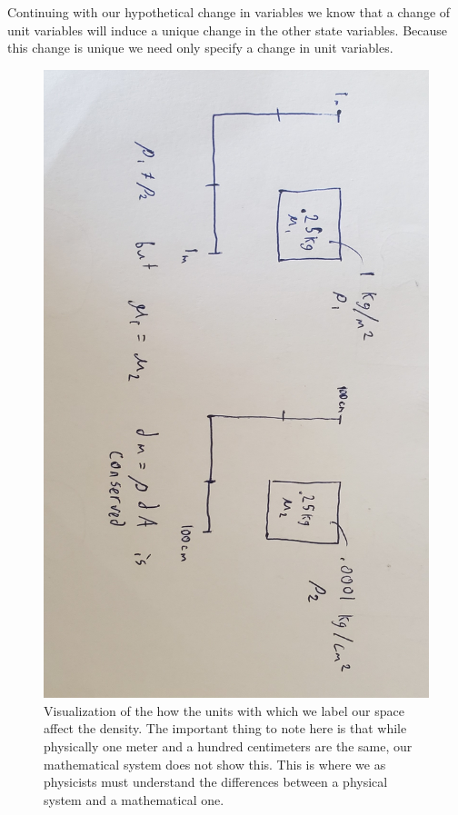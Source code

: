 \documentclass{article}
\begin{document}
	 Continuing with our hypothetical change in variables we know that a change of unit variables will induce a unique change in the other state variables. Because this change is unique we need only specify a change in unit variables. 
	 
	
\begin{figure}[!ht]
\centerline{\includegraphics[width=\textwidth,angle=90,scale=.45]{diagram5.jpg}}
\caption{Visualization of the how the units with which we label our space affect the density. The important thing to note here is that while physically one meter and a hundred centimeters are the same, our mathematical system does not show this. This is where we as physicists must understand the differences between a physical system and a mathematical one.}
\end{figure}
\end{document}
